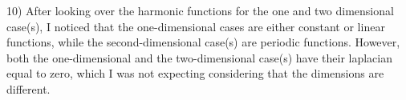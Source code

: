 \documentclass[executivepaper]{article}
\begin{document}
\begin{flushleft}

10) After looking over the harmonic functions for the one and two dimensional case(s), I noticed that the one-dimensional cases are either constant or linear functions, while the second-dimensional case(s) are periodic functions. However, both the one-dimensional and the two-dimensional case(s) have their laplacian equal to zero, which I was not expecting considering that the dimensions are different. 

\end{flushleft}
\end{document}
